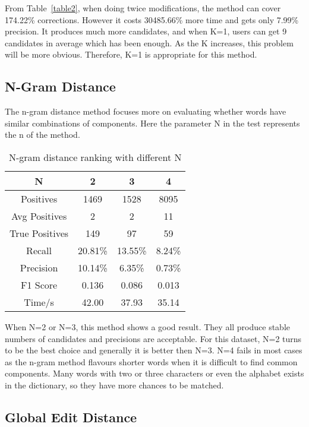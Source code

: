 \documentclass[11pt]{article}
\begin{document}
From Table~\ref{table2}, when doing twice modifications, the method can cover 174.22\% corrections. However it costs 30485.66\% more time and gets only 7.99\% precision. It produces much more candidates, and when K=1, users can get 9 candidates in average which has been enough. As the K increases, this problem will be more obvious. Therefore, K=1 is appropriate for this method. 

\subsection{N-Gram Distance}

The n-gram distance method focuses more on evaluating whether words have similar combinations of components. Here the parameter N in the test represents the n of the method.

\begin{table}[h]
 \begin{center}
\begin{tabular}{ |c||c|c|c| }
      \hline
      N & 2 & 3 & 4\\
      \hline
      Positives & 1469 & 1528 & 8095\\
      Avg Positives & 2 & 2 & 11\\
      True Positives & 149 & 97 &59\\
      Recall & 20.81\% & 13.55\% & 8.24\%\\
      Precision & 10.14\% & 6.35\% & 0.73\%\\
      F1 Score & 0.136 & 0.086 & 0.013\\
      Time/s & 42.00 & 37.93 & 35.14\\
      \hline
\end{tabular}
\caption{N-gram distance ranking with different N}\label{table3}
 \end{center}
\end{table}

When N=2 or N=3, this method shows a good result. They all produce stable numbers of candidates and precisions are acceptable. For this dataset, N=2 turns to be the best choice and generally it is better then N=3. N=4 fails in most cases as the n-gram method flavours shorter words when it is difficult to find common components. Many words with two or three characters or even the alphabet exists in the dictionary, so they have more chances to be matched. 

\subsection{Global Edit Distance}
\end{document}
